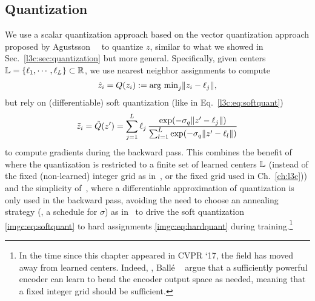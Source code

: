 \subsection{Quantization}\label{imgc:sec:quant}
We use a scalar quantization approach based on the vector quantization approach proposed by Agustsson~\etal~\cite{agustsson2017soft} to quantize $z$, similar to what we 
showed in Sec.~\ref{l3c:sec:quantization} but more general. 
Specifically, given centers
$\mathbb{L}=\{\ell_1,\cdots,\ell_L\} \subset \mathbb R$, we use nearest neighbor
assignments to compute
\begin{equation} \label{imgc:eq:hardquant}
    \hat{z}_i = Q(z_i) := \text{arg min}_{j} \|z_i-\ell_j\|,
\end{equation}
but rely on (differentiable) soft quantization (like in Eq.~\ref{l3c:eq:softquant})
\begin{equation} 
\tilde z_i = \tilde Q(z') = \sum_{j=1}^L  \ell_j \, \frac{\exp(-\sigma_q\|z'-\ell_j\|)}{\sum_{l=1}^L \exp(-\sigma_q\|z'-\ell_l\|)} \label{imgc:eq:softquant}
\end{equation}
to compute gradients during the backward pass. This combines the benefit
of~\cite{agustsson2017soft} where the quantization is restricted to a finite
set of learned centers $\mathbb{L}$ (instead of the fixed (non-learned) integer
grid as in~\cite{theis2017lossy}, or the fixed grid used in Ch.~\ref{ch:l3c})) and the simplicity of~\cite{theis2017lossy},
where a differentiable approximation of quantization is only used in the
backward pass, avoiding the need to choose an annealing strategy (\ie, a
schedule for $\sigma$) as in~\cite{agustsson2017soft} to drive the soft
quantization \eqref{imgc:eq:softquant} to hard assignments
\eqref{imgc:eq:hardquant} during training.\footnote{In the time since this chapter appeared in CVPR `17, the field has moved away from learned centers. Indeed, \eg, Ballé \etal~\cite{balle2020nonlinear} argue that a sufficiently powerful encoder can learn to bend the encoder output space as needed, meaning that a fixed integer grid should be sufficient.}

